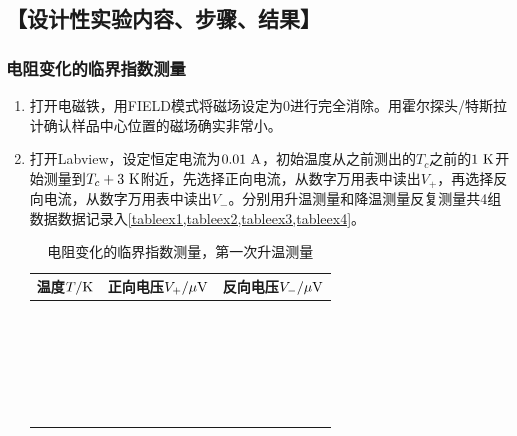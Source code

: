 \documentclass[11pt,a4paper]{ctexart}
\newcommand{\unit}[1]{\rm \ #1}
\begin{document}
\subsection{【设计性实验内容、步骤、结果】}
\subsubsection{电阻变化的临界指数测量}
\begin{enumerate}
\item
打开电磁铁，用FIELD模式将磁场设定为0进行完全消除。用霍尔探头/特斯拉计确认样品中心位置的磁场确实非常小。
\item
打开Labview，设定恒定电流为$0.01\unit{A}$，初始温度从之前测出的$T_c$之前的$1\unit{K}$开始测量到$T_c + 3\unit{K}$附近，先选择正向电流，从数字万用表中读出$V_+$，再选择反向电流，从数字万用表中读出$V_-$。分别用升温测量和降温测量反复测量共4组数据数据记录入\cref{tableex1,tableex2,tableex3,tableex4}。
\begin{table}[H]
\centering
\caption{电阻变化的临界指数测量\label{tableex1}，第一次升温测量}
\begin{tabular}{|p{32mm}|p{32mm}|p{32mm}|}
\hline
温度$T/{\rm K}$ & 正向电压$V_+/{\rm \mu V}$ & 反向电压$V_-/{\rm \mu V}$ \\ \hline
 & & \\ \hline
  & & \\ \hline
  & & \\ \hline
   & & \\ \hline
    & & \\ \hline
 & & \\ \hline
  &  &\\ \hline
  &  &\\ \hline
  &  &\\ \hline
  &  &\\ \hline
  &  &\\ \hline
  &  &\\ \hline
  &  &\\ \hline
  &  &\\ \hline
  &  &\\ \hline
  &  &\\ \hline
  &  &\\ \hline
  &  &\\ \hline
    & &\\ \hline
  & &\\ \hline
   & &\\ \hline
     &  &\\ \hline
  &  &\\ \hline
  &  &\\ \hline

\end{tabular}
\end{table}
\end{enumerate}
\end{document}
